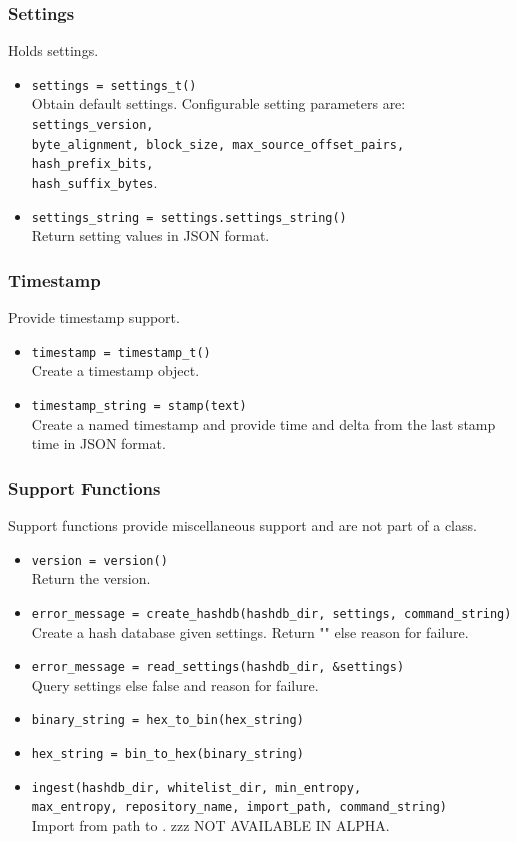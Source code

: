\documentclass[11pt,fleqn]{article} %
\begin{document}
\subsubsection{Settings}
Holds \hdb settings.

\begin{itemize}
\item \verb+settings = settings_t()+\\
Obtain default settings. Configurable setting parameters are: \verb+settings_version,+\\
\verb+byte_alignment, block_size, max_source_offset_pairs, hash_prefix_bits,+\\
\verb+hash_suffix_bytes+.
\item \verb+settings_string = settings.settings_string()+\\
Return setting values in JSON format.
\end{itemize}

\subsubsection{Timestamp}
Provide timestamp support.

\begin{itemize}
\item \verb+timestamp = timestamp_t()+\\
Create a timestamp object.
\item \verb+timestamp_string = stamp(text)+\\
Create a named timestamp and provide time and delta from the last stamp time in JSON format.
\end{itemize}

\subsubsection{Support Functions}
Support functions provide miscellaneous support and are not part of a class.
\begin{itemize}
\item \verb+version = version()+\\
Return the \hdb version.
\item \verb+error_message = create_hashdb(hashdb_dir, settings, command_string)+\\
Create a hash database given settings. Return "" else reason for failure.
\item \verb+error_message = read_settings(hashdb_dir, &settings)+\\
Query settings else false and reason for failure.
\item \verb+binary_string = hex_to_bin(hex_string)+
\item \verb+hex_string = bin_to_hex(binary_string)+
\item \verb+ingest(hashdb_dir, whitelist_dir, min_entropy,+\\
\verb+max_entropy, repository_name, import_path, command_string)+\\
Import from path to \hdb. zzz NOT AVAILABLE IN ALPHA.
\end{itemize}
\end{document}
